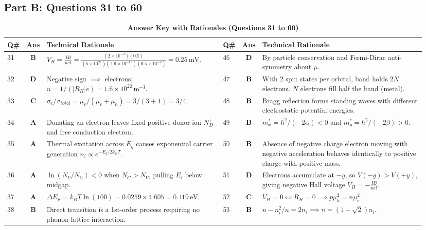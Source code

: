 \subsection*{Part B: Questions 31 to 60}
\begin{table}[htbp]
\centering
\caption{\textbf{Answer Key with Rationales (Questions 31 to 60)}}
\vspace{2mm}
\small
\begin{tabularx}{\textwidth}{l c X l c X}
\toprule
\textbf{Q\#} & \textbf{Ans} & \textbf{Technical Rationale} & \textbf{Q\#} & \textbf{Ans} & \textbf{Technical Rationale} \\
\midrule
31 & \textbf{B} & $V_H = \frac{IB}{net} = \frac{(2\times 10^{-3})(0.5)}{(5\times 10^{22})(1.6\times 10^{-19})(0.5\times 10^{-3})} = 0.25\,\text{mV}$. & 46 & \textbf{D} & By particle conservation and Fermi-Dirac anti-symmetry about $\mu$. \\
32 & \textbf{D} & Negative sign $\implies$ electrons; $n = 1/(|R_H|e) = 1.6\times 10^{22}\,\text{m}^{-3}$. & 47 & \textbf{B} & With 2 spin states per orbital, band holds $2N$ electrons. $N$ electrons fill half the band (metal). \\
33 & \textbf{C} & $\sigma_e / \sigma_{total} = \mu_e / (\mu_e + \mu_h) = 3/(3+1) = 3/4$. & 48 & \textbf{B} & Bragg reflection forms standing waves with different electrostatic potential energies. \\
34 & \textbf{A} & Donating an electron leaves fixed positive donor ion $N_D^+$ and free conduction electron. & 49 & \textbf{B} & $m_x^* = \hbar^2/(-2\alpha) < 0$ and $m_y^* = \hbar^2/(+2\beta) > 0$. \\
35 & \textbf{A} & Thermal excitation across $E_g$ causes exponential carrier generation $n_i \propto e^{-E_g/2k_BT}$. & 50 & \textbf{B} & Absence of negative charge electron moving with negative acceleration behaves identically to positive charge with positive mass. \\
36 & \textbf{A} & $\ln(N_V/N_C) < 0$ when $N_C > N_V$, pulling $E_i$ below midgap. & 51 & \textbf{D} & Electrons accumulate at $-y$, so $V(-y) > V(+y)$, giving negative Hall voltage $V_H = -\frac{IB}{net}$. \\
37 & \textbf{A} & $\Delta E_F = k_BT \ln(100) = 0.0259 \times 4.605 = 0.119\,\text{eV}$. & 52 & \textbf{C} & $V_H = 0 \iff R_H = 0 \implies p\mu_h^2 = n\mu_e^2$. \\
38 & \textbf{B} & Direct transition is a 1st-order process requiring no phonon lattice interaction. & 53 & \textbf{B} & $n - n_i^2/n = 2n_i \implies n = (1+\sqrt{2})n_i$. \\

\end{tabularx}
\end{table}
